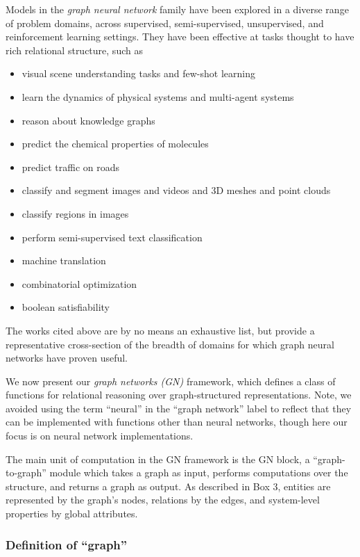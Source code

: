 \documentclass[10pt]{book}
\let\defaultmarginpar\marginpar
\renewcommand\marginpar[2][]{\defaultmarginpar{\itshape\color{gray}#2}}
\begin{document}
Models in the \emph{graph neural network}\marginpar{graph neural networks} family have been explored in a diverse range of problem domains, across supervised, semi-supervised, unsupervised, and reinforcement learning settings. They have been effective at tasks thought to have rich relational structure, such as
\begin{itemize}
    \item visual scene understanding tasks and few-shot learning
    \item learn the dynamics of physical systems and multi-agent systems 
    \item reason about knowledge graphs
    \item predict the chemical properties of molecules
    \item predict traffic on roads
    \item classify and segment images and videos and 3D meshes and point clouds
    \item classify regions in images
    \item perform semi-supervised text classification
    \item machine translation
    \item combinatorial optimization
    \item boolean satisfiability
\end{itemize}

The works cited above are by no means an exhaustive list, but provide a representative cross-section of the breadth of domains for which graph neural networks have proven useful.

We now present our \emph{graph networks (GN)}\marginpar{graph networks (GN)} framework, which defines a class of functions for relational reasoning over graph-structured representations.  Note, we avoided using the term ``neural'' in the ``graph network'' label to reflect that they can be implemented with functions other than neural networks, though here our focus is on neural network implementations.

The main unit of computation in the GN framework is the GN block, a ``graph-to-graph'' module which takes a graph as input, performs computations over the structure, and returns a graph as output. As described in Box 3, entities are represented by the graph's nodes, relations by the edges, and system-level properties by global attributes.

\subsubsection{Definition of ``graph''}
\end{document}
